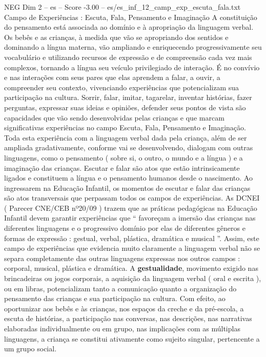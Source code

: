\begin{textsample}{NEG Dim 2 – es – Score -3.00 – es/es\_inf\_12\_camp\_exp\_escuta\_fala.txt}  \label{ex:f2_neg_071}
Campo de Experiências : Escuta, Fala, Pensamento e Imaginação A constituição do pensamento está associada ao domínio e à apropriação da linguagem verbal.
Os bebês e as crianças, à medida que vão se apropriando dos sentidos e dominando a língua materna, vão ampliando e enriquecendo progressivamente seu vocabulário e utilizando recursos de expressão e de compreensão cada vez mais complexos, tornando a língua seu veículo privilegiado de interação.
É no convívio e nas interações com seus pares que elas aprendem a falar, a ouvir, a compreender seu contexto, vivenciando experiências que potencializam sua participação na cultura.
Sorrir, falar, imitar, tagarelar, inventar histórias, fazer perguntas, expressar suas ideias e opiniões, defender seus pontos de vista são capacidades que vão sendo desenvolvidas pelas crianças e que marcam significativas experiências no campo Escuta, Fala, Pensamento e Imaginação.
Toda esta experiência com a linguagem verbal dada pela criança, além de ser ampliada gradativamente, conforme vai se desenvolvendo, dialogam com outras linguagens, como o pensamento ( sobre si, o outro, o mundo e a língua ) e a imaginação das crianças.
Escutar e falar são atos que estão intrinsicamente ligados e constituem a língua e o pensamento humanos desde o nascimento.
Ao ingressarem na Educação Infantil, os momentos de escutar e falar das crianças são atos transversais que perpassam todos os campos de experiências.
As DCNEI ( Parecer CNE/CEB nº20/09 ) trazem que as práticas pedagógicas na Educação Infantil devem garantir experiências que “ favoreçam a imersão das crianças nas diferentes linguagens e o progressivo domínio por elas de diferentes gêneros e formas de expressão : gestual, verbal, plástica, dramática e musical ”.
Assim, este campo de experiências que evidencia muito claramente a linguagem verbal não se separa completamente das outras linguagens expressas nos outros campos : corporal, musical, plástica e dramática.
A \textbf{gestualidade}, movimento exigido nas brincadeiras ou jogos corporais, a aquisição da linguagem verbal ( oral e escrita ), ou em libras, potencializam tanto a comunicação quanto a organização do pensamento das crianças e sua participação na cultura.
Com efeito, ao oportunizar aos bebês e às crianças, nos espaços da creche e da pré-escola, a escuta de histórias, a participação nas conversas, nas descrições, nas narrativas elaboradas individualmente ou em grupo, nas implicações com as múltiplas linguagens, a criança se constitui ativamente como sujeito singular, pertencente a um grupo social.

\end{textsample}
